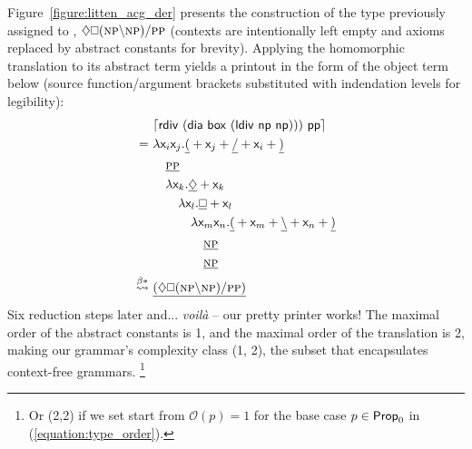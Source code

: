 Figure~\ref{figure:litten_acg_der} presents the construction of the type previously assigned to , $\diamond\bx (\np[s]\divleft\np[s])\divright\pp[s]$ (contexts are intentionally left empty and axioms replaced by abstract constants for brevity).
Applying the homomorphic translation to its abstract term yields a printout in the form of the object term below (source function/argument brackets substituted with indendation levels for legibility):
\begin{equation}
	{
	\begin{aligned}
	& 			\hm{\term{rdiv~(dia~box~(ldiv~np~np)))~pp}}\\
	= \
	&				\smallterm{\lam  \vari\varj.\underline{(} + \varj + \underline{\divright} + \vari + \underline{)}}\\
	& \quad			\underline{\smallprop{pp}}\\
	& \quad 		\smallterm{\lam  \vark.\underline{\diamond} + \vark}\\
	& \qquad 		\smallterm{\lam  \varl.\underline{\bx} + \varl}\\
	& \qqquad		\smallterm{\lam  \Var{m}\Var{n}.\underline{(} + \Var{m} + \underline{\divleft} + \Var{n} + \underline{)}} \\
	& \qqqquad		\underline{\smallprop{np}}\\
	& \qqqquad		\underline{\smallprop{np}}\\
	\bredstar \
	&				\underline{(
						\diamond \bx ( \np \divleft \np )
						\divright \pp[s] 
						)}
	\end{aligned}
	}
\end{equation}
Six reduction steps later and... \textit{voil\`{a}} -- our pretty printer works!
The maximal order of the abstract constants is 1,
and the maximal order of the translation is 2, making our grammar's complexity class (1, 2), the subset that encapsulates context-free grammars.%
	\footnote{Or (2,2) if we set start from $\mathcal{O}(p) = 1$ for the base case $p \in \mathsf{Prop}_0$ in (\ref{equation:type_order}).}


